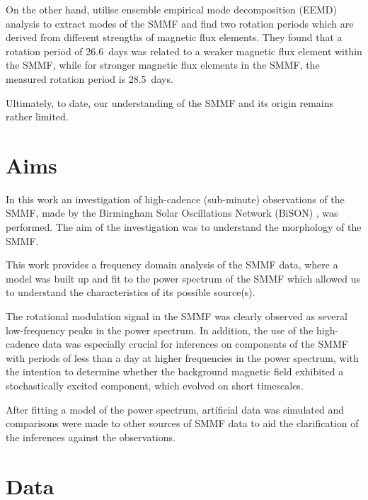 On the other hand, \citet{xiang_ensemble_2016} utilise ensemble empirical mode decomposition (EEMD) analysis to extract modes of the SMMF and find two rotation periods which are derived from different strengths of magnetic flux elements. They found that a rotation period of 26.6~days was related to a weaker magnetic flux element within the SMMF, while for stronger magnetic flux elements in the SMMF, the measured rotation period is 28.5~days.

Ultimately, to date, our understanding of the SMMF and its origin remains rather limited.




\section{Aims}\label{sec:SMMF_aims}

In this work an investigation of high-cadence (sub-minute) observations of the SMMF, made by the Birmingham Solar Oscillations Network (BiSON) \citep{chaplin_bison_1996, chaplin_noise_2005, hale_performance_2016}, was performed. The aim of the investigation was to understand the morphology of the SMMF. 

This work provides a frequency domain analysis of the SMMF data, where a model was built up and fit to the power spectrum of the SMMF which allowed us to understand the characteristics of its possible source(s). 

The rotational modulation signal in the SMMF was clearly observed as several low-frequency peaks in the power spectrum. In addition, the use of the high-cadence data was especially crucial for inferences on components of the SMMF with periods of less than a day at higher frequencies in the power spectrum, with the intention to determine whether the background magnetic field exhibited a stochastically excited component, which evolved on short timescales.

After fitting a model of the power spectrum, artificial data was simulated and comparisons were made to other sources of SMMF data to aid the clarification of the inferences against the observations.



\section{Data}\label{sec:SMMF_data}



